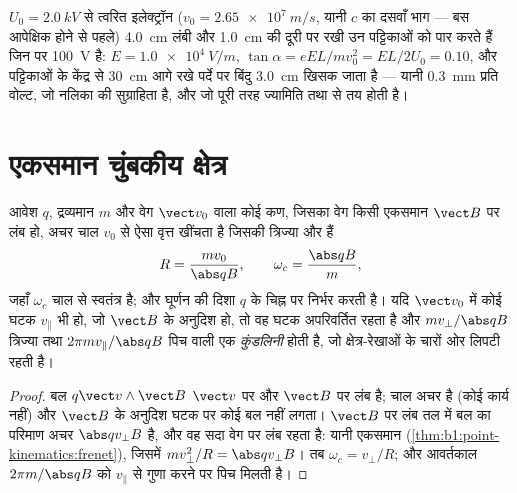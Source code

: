 \begin{example}[दोलनदर्शी की नलिका]\label{ex:b1:charged-particles:crt}
$U_0 = \qty{2.0}{kV}$ से त्वरित इलेक्ट्रॉन ($v_0 = \qty{2.65e7}{m/s}$, यानी
$c$ का दसवाँ भाग --- बस आपेक्षिक होने से पहले) \qty{4.0}{cm} लंबी और
\qty{1.0}{cm} की दूरी पर रखी उन पट्टिकाओं को पार करते हैं जिन पर
\qty{100}{V} है: $E = \qty{1.0e4}{V/m}$,
$\tan\alpha = eEL/mv_0^2 = EL/2U_0 = 0.10$, और पट्टिकाओं के केंद्र से
\qty{30}{cm} आगे रखे पर्दे पर बिंदु \qty{3.0}{cm} खिसक जाता है --- यानी
\qty{0.3}{mm} प्रति वोल्ट, जो नलिका की सुग्राहिता है, और जो पूरी तरह
ज्यामिति तथा  से तय होती है।
\end{example}

\section{एकसमान चुंबकीय क्षेत्र}

\begin{theorem}[एकसमान चुंबकीय क्षेत्र में गति]\label{thm:b1:charged-particles:bfield}
आवेश $q$, द्रव्यमान $m$ और वेग $\vect v_0$ वाला कोई कण, जिसका वेग किसी
एकसमान $\vect B$ पर लंब हो, अचर चाल $v_0$ से ऐसा वृत्त खींचता है जिसकी
त्रिज्या और  हैं
\[
R = \frac{mv_0}{\abs q B}, \qquad \omega_c = \frac{\abs q B}{m},
\]
जहाँ \emph{} $\omega_c$ चाल से स्वतंत्र है; और घूर्णन
की दिशा $q$ के चिह्न पर निर्भर करती है। यदि $\vect v_0$ में कोई घटक
$v_\parallel$ भी हो, जो $\vect B$ के अनुदिश हो, तो वह घटक अपरिवर्तित रहता है और 
$mv_\perp/\abs qB$ त्रिज्या तथा $2\pi mv_\parallel/\abs qB$ पिच वाली एक
\emph{कुंडलिनी} होती है, जो क्षेत्र-रेखाओं के चारों ओर लिपटी रहती है।
\end{theorem}

\begin{proof}
बल $q\vect v\wedge\vect B$ $\vect v$ पर और $\vect B$ पर लंब है; चाल अचर है
(कोई कार्य नहीं) और $\vect B$ के अनुदिश घटक पर कोई बल नहीं लगता।
$\vect B$ पर लंब तल में बल का परिमाण अचर $\abs qv_\perp B$ है, और वह सदा
वेग पर लंब रहता है: यानी एकसमान 
(\cref{thm:b1:point-kinematics:frenet}), जिसमें $mv_\perp^2/R =
\abs qv_\perp B$। तब $\omega_c = v_\perp/R$; और आवर्तकाल $2\pi m/\abs qB$ को
$v_\parallel$ से गुणा करने पर पिच मिलती है।
\end{proof}

